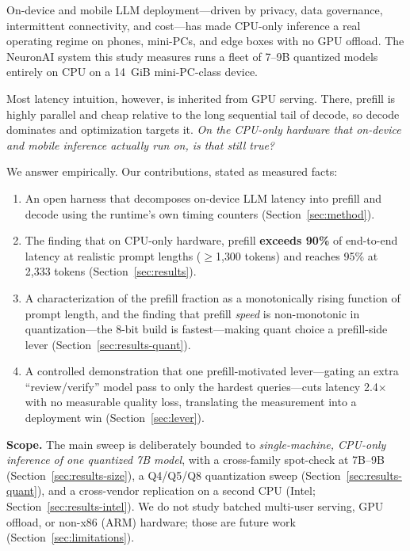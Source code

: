 \documentclass[sigconf,nonacm,10pt]{acmart}
\begin{document}
On-device and mobile LLM deployment---driven by privacy, data governance,
intermittent connectivity, and cost---has made CPU-only inference a real
operating regime on phones, mini-PCs, and edge boxes with no GPU offload.
The NeuronAI system this study measures runs a fleet of 7--9B quantized
models entirely on CPU on a 14~GiB mini-PC-class device.

Most latency intuition, however, is inherited from GPU serving. There,
prefill is highly parallel and cheap relative to the long sequential tail
of decode, so decode dominates and optimization targets it. \emph{On the
CPU-only hardware that on-device and mobile inference actually run on, is
that still true?}

We answer empirically. Our contributions, stated as measured facts:
\begin{enumerate}
  \item An open harness that decomposes on-device LLM latency into prefill
        and decode using the runtime's own timing counters
        (Section~\ref{sec:method}).
  \item The finding that on CPU-only hardware, prefill \textbf{exceeds
        90\%} of end-to-end latency at realistic prompt lengths
        ($\geq$1{,}300 tokens) and reaches 95\% at 2{,}333 tokens
        (Section~\ref{sec:results}).
  \item A characterization of the prefill fraction as a monotonically
        rising function of prompt length, and the finding that prefill
        \emph{speed} is non-monotonic in quantization---the 8-bit build is
        fastest---making quant choice a prefill-side lever
        (Section~\ref{sec:results-quant}).
  \item A controlled demonstration that one prefill-motivated lever---gating
        an extra ``review/verify'' model pass to only the hardest
        queries---cuts latency 2.4$\times$ with no measurable quality loss,
        translating the measurement into a deployment win
        (Section~\ref{sec:lever}).
\end{enumerate}

\noindent\textbf{Scope.} The main sweep is deliberately bounded to
\emph{single-machine, CPU-only inference of one quantized 7B model}, with a
cross-family spot-check at 7B--9B (Section~\ref{sec:results-size}), a
Q4/Q5/Q8 quantization sweep (Section~\ref{sec:results-quant}), and a
cross-vendor replication on a second CPU (Intel;
Section~\ref{sec:results-intel}). We do not study batched multi-user serving,
GPU offload, or non-x86 (ARM) hardware; those are future work
(Section~\ref{sec:limitations}).
\end{document}
